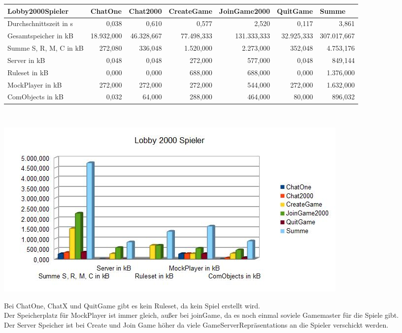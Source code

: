 \documentclass[a4paper]{article}
\begin{document}
\noindent
\begin{tabular}{|l|r|r|r|r|r|r|}
\hline
Lobby2000Spieler & \multicolumn{1}{l|}{ChatOne} & \multicolumn{1}{l|}{Chat2000} & \multicolumn{1}{l|}{CreateGame} & \multicolumn{1}{l|}{JoinGame2000} & \multicolumn{1}{l|}{QuitGame} & \multicolumn{1}{l|}{Summe} \\ \hline
Durchschnittszeit in s & 0,038 & 0,610 & 0,577 & 2,520 & 0,117 & 3,861 \\ \hline
Gesamtspeicher in kB & 18.932,000 & 46.328,667 & 77.498,333 & 131.333,333 & 32.925,333 & 307.017,667 \\ \hline
Summe S, R, M, C in kB & 272,080 & 336,048 & 1.520,000 & 2.273,000 & 352,048 & 4.753,176 \\ \hline
Server in kB & 0,048 & 0,048 & 272,000 & 577,000 & 0,048 & 849,144 \\ \hline
Ruleset in kB & 0,000 & 0,000 & 688,000 & 688,000 & 0,000 & 1.376,000 \\ \hline
MockPlayer in kB & 272,000 & 272,000 & 272,000 & 544,000 & 272,000 & 1.632,000 \\ \hline
ComObjects in kB & 0,032 & 64,000 & 288,000 & 464,000 & 80,000 & 896,032 \\ \hline
\end{tabular}
\ \\
\begin{center}
\includegraphics[scale=0.75]{3}
\end{center}
Bei ChatOne, ChatX und QuitGame gibt es kein Ruleset, da kein Spiel erstellt wird. \\
Der Speicherplatz für MockPlayer ist immer gleich, außer bei joinGame, da es noch einmal soviele Gamemaster für die Spiele gibt. \\
Der Server Speicher ist bei Create und Join Game höher da viele GameServerRepräsentations an die Spieler verschickt werden. \\
\end{document}
